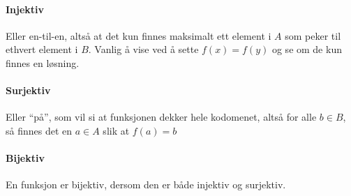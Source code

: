 \paragraph*{Injektiv} Eller en-til-en, altså at det kun finnes maksimalt ett element i $A$ som peker til ethvert element i $B$. Vanlig å vise ved å sette $f(x)=f(y)$ og se om de kun finnes en løsning.
\paragraph*{Surjektiv} Eller \enquote{på}, som vil si at funksjonen dekker hele kodomenet, altså for alle $b\in B$, så finnes det en $a\in A$ slik at $f(a)=b$
\paragraph*{Bijektiv} En funksjon er bijektiv, dersom den er både injektiv og surjektiv.

